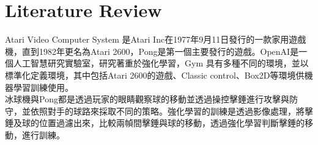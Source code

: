 \chapter{Literature Review}
Atari Video Computer System 是Atari Inc在1977年9月11日發行的一款家用遊戲機，直到1982年更名為Atari 2600，Pong是第一個主要發行的遊戲。OpenAI是一個人工智慧研究實驗室，研究著重於強化學習，Gym 具有多種不同的環境，並以標準化定義環境，其中包括Atari 2600的遊戲、Classic control、Box2D等環境供機器學習訓練使用。\\

冰球機與Pong都是透過玩家的眼睛觀察球的移動並透過操控擊錘進行攻擊與防守，並依照對手的球路來採取不同的策略。強化學習的訓練是透過影像處理，將擊錘及球的位置過濾出來，比較兩幀間擊錘與球的移動，透過強化學習判斷擊錘的移動，進行訓練。\\